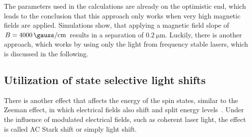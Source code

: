 The parameters used in the calculations are already on the optimistic end, which leads to the conclusion that this approach only works when very high magnetic fields are applied. Simulations show, that applying a magnetic field slope of $B=\SI{4000}{\gauss\per\centi\meter}$ results in a separation of $\SI{0.2}{\micro\meter}$. Luckily, there is another approach, which works by using only the light from frequency stable lasers, which is discussed in the following.

\begin{figure}[tbp]%
\end{figure}

\subsection{Utilization of state selective light shifts}

There is another effect that affects the energy of the spin states, similar to the Zeeman effect, in which electrical fields also shift and split energy levels~\cite{Voigt, Courtney1995}. Under the influence of modulated electrical fields, such as coherent laser light, the effect is called AC Stark shift or simply light shift.

